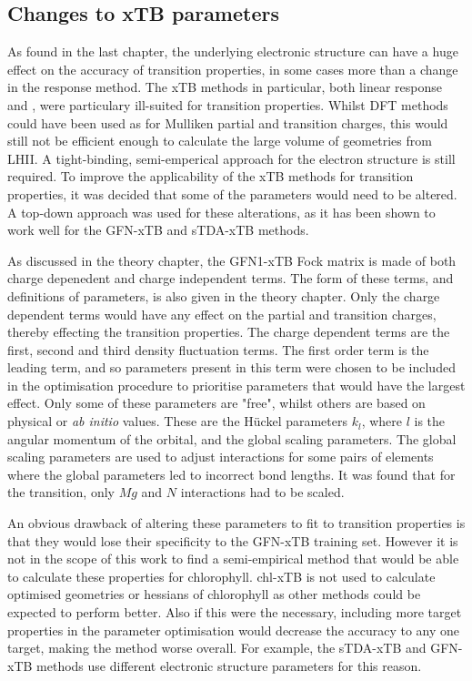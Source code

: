 \subsection{Changes to xTB parameters}
\label{subsec:chl_method}

As found in the last chapter, the underlying electronic structure can have a huge
effect on the accuracy of transition properties, in some cases more than a change
in the response method. The xTB methods in particular, both linear response and
\dxtb, were particulary ill-suited for transition properties. Whilst DFT methods
could have been used as for Mulliken partial and transition charges, this would
still not be efficient enough to calculate the large volume of geometries from LHII. A 
tight-binding, semi-emperical approach for the electron structure is still required.
To improve the applicability of the xTB methods for transition properties, it was
decided that some of the parameters would need to be altered. A top-down approach
was used for these alterations, as it has been shown to work well for the GFN-xTB
and sTDA-xTB methods. 

As discussed in the theory chapter, the GFN1-xTB Fock matrix is made of both charge
depenedent and charge independent terms. The form of these terms, and definitions
of parameters, is also given in the theory chapter. Only the charge dependent terms would
have any effect on the partial and transition charges, thereby effecting the transition
properties. The charge dependent terms are the first, second and third density fluctuation
terms. The first order term is the leading term, and so parameters present in this
term were chosen to be included in the optimisation procedure to prioritise parameters
that would have the largest effect. Only some of these parameters are "free", 
whilst others are based on physical or \emph{ab initio} values. These are the H{\"u}ckel
parameters $k_l$, where $l$ is the angular momentum of the orbital, and the global
scaling parameters. The global scaling parameters are used to adjust interactions
for some pairs of elements where the global parameters led to incorrect bond lengths.
It was found that for the \Qy transition, only $Mg$ and $N$ interactions had to 
be scaled.

An obvious drawback of altering these parameters to fit to transition properties
is that they would lose their specificity to the GFN-xTB training set. However
it is not in the scope of this work to find a semi-empirical method that would be able
to calculate these properties for chlorophyll. chl-xTB is not used to calculate
optimised geometries or hessians of chlorophyll as other methods could be expected 
to perform better. Also if this were the necessary, including more target properties
in the parameter optimisation would decrease the accuracy to any one target, making
the method worse overall. For example, the sTDA-xTB and GFN-xTB methods use different
electronic structure parameters for this reason.

